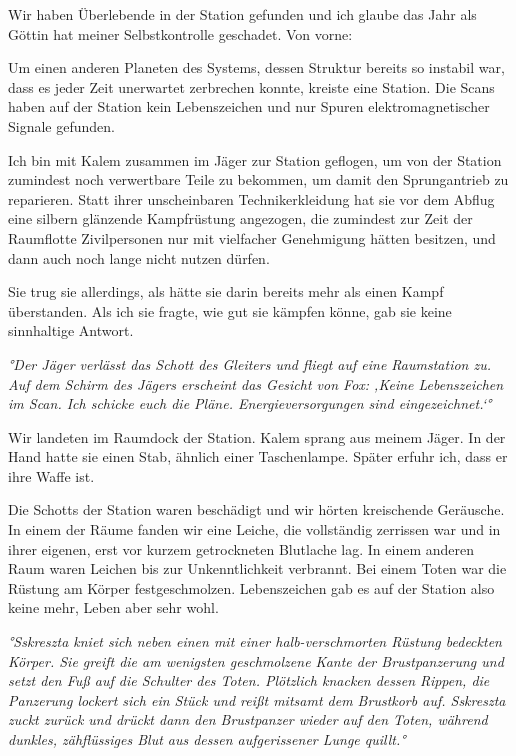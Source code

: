 \documentclass[11pt]{article}
\begin{document}
Wir haben Überlebende in der Station gefunden und ich glaube das Jahr
als Göttin hat meiner Selbstkontrolle geschadet. Von vorne:

Um einen anderen Planeten des Systems, dessen Struktur bereits so
instabil war, dass es jeder Zeit unerwartet zerbrechen konnte, kreiste
eine Station. Die Scans haben auf der Station kein Lebenszeichen und nur
Spuren elektromagnetischer Signale gefunden.

Ich bin mit Kalem zusammen im Jäger zur Station geflogen, um von der
Station zumindest noch verwertbare Teile zu bekommen, um damit den
Sprungantrieb zu reparieren. Statt ihrer unscheinbaren Technikerkleidung
hat sie vor dem Abflug eine silbern glänzende Kampfrüstung angezogen,
die zumindest zur Zeit der Raumflotte Zivilpersonen nur mit vielfacher
Genehmigung hätten besitzen, und dann auch noch lange nicht nutzen
dürfen.

Sie trug sie allerdings, als hätte sie darin bereits mehr als einen
Kampf überstanden. Als ich sie fragte, wie gut sie kämpfen könne, gab
sie keine sinnhaltige Antwort.

\emph{°Der Jäger verlässt das Schott des Gleiters und fliegt auf eine
Raumstation zu. Auf dem Schirm des Jägers erscheint das Gesicht von Fox:
‚Keine Lebenszeichen im Scan. Ich schicke euch die Pläne.
Energieversorgungen sind eingezeichnet.`°}

Wir landeten im Raumdock der Station. Kalem sprang aus meinem Jäger. In
der Hand hatte sie einen Stab, ähnlich einer Taschenlampe. Später erfuhr
ich, dass er ihre Waffe ist.

Die Schotts der Station waren beschädigt und wir hörten kreischende
Geräusche. In einem der Räume fanden wir eine Leiche, die vollständig
zerrissen war und in ihrer eigenen, erst vor kurzem getrockneten
Blutlache lag. In einem anderen Raum waren Leichen bis zur
Unkenntlichkeit verbrannt. Bei einem Toten war die Rüstung am Körper
festgeschmolzen. Lebenszeichen gab es auf der Station also keine mehr,
Leben aber sehr wohl.

\emph{°Sskreszta kniet sich neben einen mit einer halb-verschmorten
Rüstung bedeckten Körper. Sie greift die am wenigsten geschmolzene Kante
der Brustpanzerung und setzt den Fuß auf die Schulter des Toten.
Plötzlich knacken dessen Rippen, die Panzerung lockert sich ein Stück
und reißt mitsamt dem Brustkorb auf. Sskreszta zuckt zurück und drückt
dann den Brustpanzer wieder auf den Toten, während dunkles, zähflüssiges
Blut aus dessen aufgerissener Lunge quillt.°}
\end{document}
